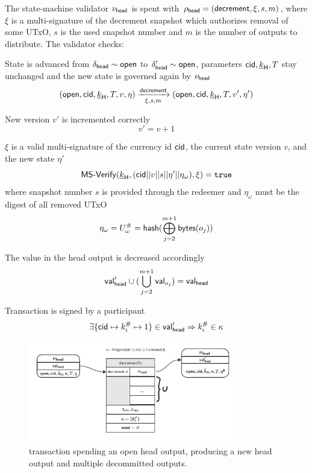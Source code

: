 \noindent The state-machine validator $\nu_\mathsf{head}$ is spent with
$\rho_{\mathsf{head}} = (\mathsf{decrement}, \xi, s, m)$, where $\xi$ is a multi-signature of
the decrement snapshot which authorizes removal of some UTxO, $s$ is the
used snapshot number and $m$ is the number of outputs to distribute. The
validator checks:
\begin{menumerate}
	\item State is advanced from $\delta_{\mathsf{head}} \sim \mathsf{open}$ to
	$\delta_{\mathsf{head}}' \sim \mathsf{open}$, parameters $\mathsf{cid},\underline{k}_{\mathsf{H}},T$ stay
	unchanged and the new state is governed again by $\nu_\mathsf{head}$
	\[
		(\mathsf{open},\mathsf{cid},\underline{k}_{\mathsf{H}},T,v,\eta) \xrightarrow[\xi, s, m]{\mathsf{decrement}} (\mathsf{open},\mathsf{cid},\underline{k}_{\mathsf{H}},T,v',\eta')
	\]
	\item New version $v'$ is incremented correctly
	\[
		v' = v + 1
	\]
	\item $\xi$ is a valid multi-signature of the currency id $\mathsf{cid}$, the current state version $v$, and the new state $\eta'$
	\[
		\mathsf{MS\textsf{-}{}Verify}(\underline{k}_{\mathsf{H}},(\mathsf{cid} || v || s || \eta' || \eta_{\omega}),\xi) = \mathtt{true}
	\]
    where snapshot number $s$ is provided through the redeemer and $\eta_{\omega}$ must be the digest of all removed UTxO
	\[
		\eta_{\omega} = U^{\#}_{\omega}  = \mathsf{hash}(\bigoplus_{j=2}^{m+1} \mathsf{bytes}(o_{j}))
	\]
	\item The value in the head output is decreased accordingly
	\[
		\mathsf{val}_{\mathsf{head}}' \cup (\bigcup_{j=2}^{m+1} \mathsf{val}_{o_{j}}) = \mathsf{val}_{\mathsf{head}}
	\]
	\item Transaction is signed by a participant
	\[
		\exists \{\mathsf{cid} \mapsto k^{\#}_{i} \mapsto 1\} \in \mathsf{val}_{\mathsf{head}}' \Rightarrow k^{\#}_{i} \in \kappa
	\]
\end{menumerate}

\begin{figure}
	\centering
	\includegraphics[width=0.8\textwidth]{figures/decrementTx.pdf}
	\caption{\mtxDecrement{} transaction spending an open head output,
		producing a new head output and multiple decommitted outputs.}\label{fig:decrementTx}
\end{figure}

